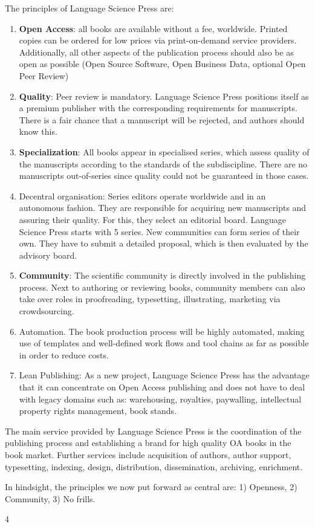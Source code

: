 \documentclass[output=guidelines,nonflat,smallfont,
draftmode
]{langsci/langscibook}
\newcommand{\evaluation}[1]{
  \renewcommand{\tblslinecolour}{lsLightOrange}
  \tblssy{receipt}{Evaluation}{\vspace*{-5mm}#1}
}
\newcommand{\othersolutions}[1]{
  \renewcommand{\tblslinecolour}{lsDarkGreenOne}
  \tblssy{more}{Other solutions}{\vspace*{-5mm}#1}
}
\renewcommand{\tblssy}[4][black!12]{%
  \renewcommand{\langscisymbol}{#2}\renewcommand{\tblsboxcolor}{#1}
  \begin{mdframed}[style=yellowexercise,frametitle={#3}]
    #4
  \end{mdframed}
}
\begin{document}
{The principles of Language Science Press are: 
\begin{enumerate}
 \item \textbf{Open Access}: all books are available without a fee, worldwide. Printed copies can be ordered for low prices via print-on-demand service providers. Additionally, all other aspects of the publication process should also be as open as possible (Open Source Software, Open Business Data, optional Open Peer Review)
 \item \textbf{Quality}: Peer review is mandatory. Language Science Press positions itself as a premium publisher with the corresponding requirements for manuscripts. There is a fair chance that a manuscript will be rejected, and authors should know this. 
 \item \textbf{Specialization}: All books appear in specialised series, which assess quality of the manuscripts according to the standards of the subdiscipline. There are no manuscripts out-of-series since quality could not be guaranteed in those cases. 
 \item Decentral organisation: Series editors operate worldwide and in an autonomous fashion. They are responsible for acquiring new manuscripts and assuring their quality. For this, they select an editorial board. Language Science Press starts with 5 series. New communities can form series of their own. They have to submit a detailed proposal, which is then evaluated by the advisory board. 
 \item \textbf{Community}: The scientific community is directly involved in the publishing process. Next to authoring or reviewing books, community members can also take over roles in proofreading, typesetting, illustrating, marketing via crowdsourcing. 
 \item Automation. The book production process will be highly automated, making use of templates and well-defined work flows and tool chains as far as possible in order to reduce costs.  
 \item Lean Publishing: As a new project, Language Science Press has the advantage that it can concentrate on Open Access publishing and does not have to deal with legacy domains such as: warehousing, royalties, paywalling, intellectual property rights management, book stands. 
\end{enumerate}

The main service provided by Language Science Press is the coordination of the publishing process and establishing a brand for high quality OA books in the book market. Further services include acquisition of authors, author support, typesetting, indexing, design, distribution, dissemination, archiving, enrichment. 
}
\evaluation{In hindsight, the principles we now put forward as central are: 1) Openness, 2) Community, 3) No frills.}
\othersolutions{4}
\end{document}
